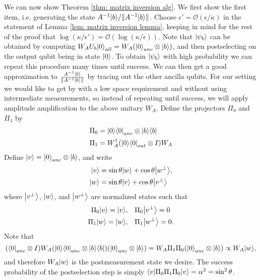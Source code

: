 \documentclass[11pt]{article}
\theoremstyle{definition}
\theoremstyle{remark}
\begin{document}
We can now show Theorem \ref{thm: matrix inversion alg}. We first show the first item, i.e. generating the state $A^{-1}{\left\vert{b}\right\rangle} / \|A^{-1}{\left\vert{b}\right\rangle}\|$. Choose $\epsilon' = \mathcal{O}(\epsilon/\kappa)$ in the statement of Lemma \ref{lem: matrix inversion lemma}, keeping in mind for the rest of the proof that $\log(\kappa/\epsilon') = \mathcal{O}(\log(\kappa/\epsilon))$. Note that ${\left\vert{\psi_b}\right\rangle}$ can be obtained by computing $W_AU_b{\left\vert{0}\right\rangle}_{all} = W_A ({\left\vert{0}\right\rangle}_{anc} \otimes {\left\vert{b}\right\rangle})$, and then postselecting on the output qubit being in state ${\left\vert{0}\right\rangle}$. To obtain ${\left\vert{\psi_b}\right\rangle}$ with high probability we can repeat this procedure many times until success. We can then get a good approximation to $\frac{A^{-1}{\left\vert{b}\right\rangle}} {\|A^{-1}{\left\vert{b}\right\rangle}\|} $ by tracing out the other ancilla qubits. For our setting we would like to get by with a low space requirement and without using intermediate measurements, so instead of repeating until success, we will apply amplitude amplification to the above unitary $W_A$. Define the projectors $\Pi_0$ and $\Pi_1$ by
\begin{align}
\Pi_0 &= {\left\vert{0}\right\rangle}{\left\langle{0}\right\vert}_{anc} \otimes {\left\vert{b}\right\rangle}{\left\langle{b}\right\vert} \\
\Pi_1 &= W_A^\dagger ({\left\vert{0}\right\rangle}{\left\langle{0}\right\vert}_{out} \otimes I) W_A
\end{align}
Define ${\left\vert{v}\right\rangle} = {\left\vert{0}\right\rangle}_{anc}\otimes {\left\vert{b}\right\rangle}$, and write
\begin{align}
{\left\vert{v}\right\rangle} &= \sin \theta {\left\vert{w}\right\rangle} +\cos \theta{\left\vert{w^\perp}\right\rangle}, \\
{\left\vert{w}\right\rangle} &= \sin \theta {\left\vert{v}\right\rangle} + \cos \theta{\left\vert{v^\perp}\right\rangle}
\end{align}
where ${\left\vert{v^\perp}\right\rangle}$, ${\left\vert{w}\right\rangle}$, and ${\left\vert{w^\perp}\right\rangle}$ are normalized states such that 
\begin{align}
\Pi_0{\left\vert{v}\right\rangle} = {\left\vert{v}\right\rangle},&\quad \Pi_0{\left\vert{v^\perp}\right\rangle} = 0 \\
\Pi_1{\left\vert{w}\right\rangle} = {\left\vert{w}\right\rangle},&\quad \Pi_1{\left\vert{w^\perp}\right\rangle} = 0.
\end{align}
Note that
\begin{equation} 
({\left\langle{0}\right\vert}_{anc} \otimes I) W_A ({\left\vert{0}\right\rangle}{\left\langle{0}\right\vert}_{anc} \otimes {\left\vert{b}\right\rangle}{\left\langle{b}\right\vert}) ({\left\vert{0}\right\rangle}_{anc} \otimes {\left\vert{b}\right\rangle}) = W_A \Pi_1\Pi_0({\left\vert{0}\right\rangle}_{anc} \otimes {\left\vert{b}\right\rangle}) \propto W_A {\left\vert{w}\right\rangle},
\end{equation}
and therefore $W_A{\left\vert{w}\right\rangle}$ is the postmeasurement state we desire. The success probability of the postselection step is simply ${\left\langle{v}\right\vert}\Pi_0\Pi_1\Pi_0{\left\vert{v}\right\rangle} = \alpha^2 = \sin^2\theta$. 
\end{document}
